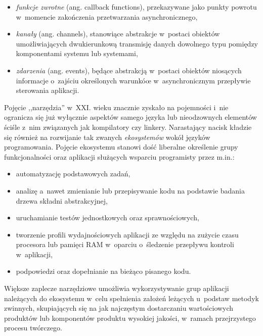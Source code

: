 {\begin{itemize}
  \begin{itemize}
    \item \emph{funkcje zwrotne} (ang. callback functions), przekazywane jako punkty powrotu w~momencie zakończenia przetwarzania asynchronicznego,
    \item \emph{kanały} (ang. channels), stanowiące abstrakcje w~postaci obiektów umożliwiających dwukierunkową transmisję danych dowolnego typu pomiędzy komponentami systemu lub systemami,
    \item \emph{zdarzenia} (ang. events), będące abstrakcją w~postaci obiektów niosących informacje o~zajściu określonych warunkóœ w~asynchronicznym przepływie sterowania aplikacji.
  \end{itemize}
\end{itemize}
}

\par{
  Pojęcie ,,narzędzia'' w~XXI. wieku znacznie zyskało na pojemności i~nie ogranicza się już wyłącznie aspektów samego języka lub nieodzownych elementów ściśle z~nim związanych jak kompilatory czy linkery.
  Narastający nacisk kładzie się również na rozwijanie tak zwanych \emph{ekosystemów} wokół języków programowania.
  Pojęcie ekosystemu stanowi dość liberalne określenie grupy funkcjonalności oraz aplikacji służących wsparciu programisty przez m.in.:
  \begin{itemize}
    \item automatyzację podstawowych zadań,
    \item analizę a~nawet zmienianie lub przepisywanie kodu na podstawie badania drzewa składni abstrakcyjnej,
    \item uruchamianie testów jednostkowych oraz sprawnościowych,
    \item tworzenie profili wydajnościowych aplikacji ze względu na zużycie czasu procesora lub pamięci RAM w~oparciu o~śledzenie przepływu kontroli w~aplikacji,
    \item podpowiedzi oraz dopełnianie na bieżąco pisanego kodu.
  \end{itemize}
}

\par{
  Większe zaplecze narzędziowe umożliwia wykorzystywanie grup aplikacji należących do ekosystemu w~celu spełnienia założeń leżących u~podstaw metodyk zwinnych, skupiających się na jak najczęstym dostarczaniu wartościowych produktów lub komponentów produktu wysokiej jakości, w~ramach przejrzystego procesu twórczego.
}




